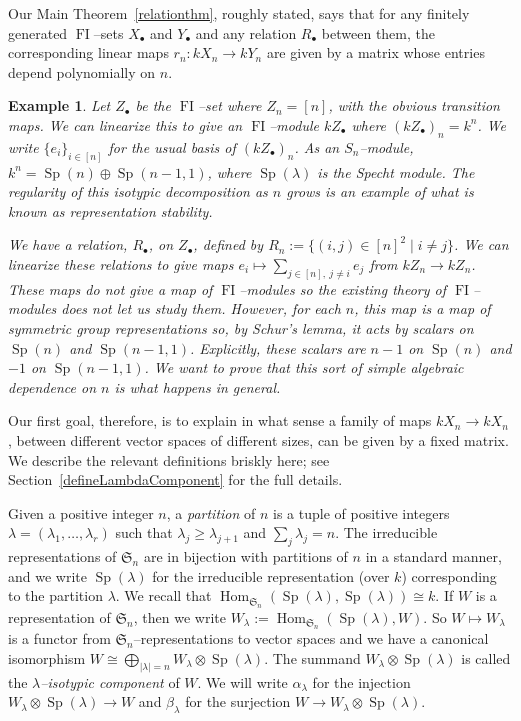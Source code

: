 \documentclass[10pt]{amsart}
\DeclareMathOperator{\FI}{FI}
\DeclareMathOperator{\Hom}{Hom}
\DeclareMathOperator{\Sp}{Sp}
\newcommand{\Sn}{\mathfrak{S}}
\newcommand{\dt}{\bullet}
\newtheorem{eg}{Example}
\theoremstyle{definition}
\begin{document}
Our Main Theorem~\ref{relationthm}, roughly stated, says that for any finitely generated $\FI$--sets $X_{\dt}$ and $Y_{\dt}$ and any relation $R_\dt$ between them, the corresponding linear maps $r_n: k X_n \to k Y_n$ are given by a matrix whose entries depend polynomially on $n$. 
\begin{eg} \label{RelationExample}
Let $Z_{\dt}$ be the $\FI$--set where $Z_n = [n]$, with the obvious transition maps. We can linearize this to give an $\FI$--module $k Z_{\dt}$ where $(k Z_{\dt})_n = k^n$. We write $\{ e_i \}_{i \in [n]}$ for the usual basis of $(k Z_{\dt})_n$. As an $S_n$--module, $k^n = \Sp(n) \oplus \Sp(n-1, 1)$, where $\Sp(\lambda)$ is the Specht module. The regularity of this isotypic decomposition as $n$ grows is an example of what is known as representation stability. 

We have a relation, $R_{\dt}$, on $Z_{\dt}$, defined by $R_n := \{ (i,j) \in [n]^2 \mid i \neq j \}$. We can linearize these relations to give maps $e_i \mapsto \sum_{j \in [n],\ j \neq i} e_j$ from $k Z_n \to k Z_n$. These maps do \emph{not} give a map of $\FI$--modules so the existing theory of $\FI$--modules does not let us study them. However, for each $n$, this map is a map of symmetric group representations so, by Schur's lemma, it acts by scalars on $\Sp(n)$ and $\Sp(n-1,1)$. Explicitly, these scalars are $n-1$ on $\Sp(n)$ and $-1$ on $\Sp(n-1,1)$. We want to prove that this sort of simple algebraic dependence on $n$ is what happens in general. 
\end{eg}

Our first goal, therefore, is to explain in what sense a family of maps $k X_n \to k X_n$, between different vector spaces of different sizes, can be given by a fixed matrix. We describe the relevant definitions briskly here; see Section~\ref{defineLambdaComponent} for the full details.

Given a positive integer $n$, a \emph{partition} of $n$ is a tuple of positive integers $\lambda = (\lambda_1,\ldots,\lambda_r)$ such that $\lambda_j \geq \lambda_{j+1}$ and $\sum_j \lambda_j = n$. The irreducible representations of $\Sn_n$ are in bijection with partitions of $n$ in a standard manner, and we write $\Sp(\lambda)$ for the irreducible representation (over $k$) corresponding to the partition $\lambda$. We recall that $\Hom_{\Sn_n}(\Sp(\lambda), \Sp(\lambda)) \cong k$. If $W$ is a representation of $\Sn_n$, then we write $W_{\lambda} := \Hom_{\Sn_n}(\Sp(\lambda), W)$. So $W \mapsto W_{\lambda}$ is a functor from $\Sn_n$--representations to vector spaces and we have a canonical isomorphism $W \cong \bigoplus_{|\lambda|=n} W_{\lambda} \otimes \Sp(\lambda)$. The summand $W_{\lambda} \otimes \Sp(\lambda)$ is called the \emph{$\lambda$--isotypic component} of $W$.
We will write $\alpha_{\lambda}$ for the injection $W_{\lambda} \otimes \Sp(\lambda) \to W$ and $\beta_{\lambda}$ for the surjection $W \to W_{\lambda} \otimes \Sp(\lambda)$.
\end{document}
